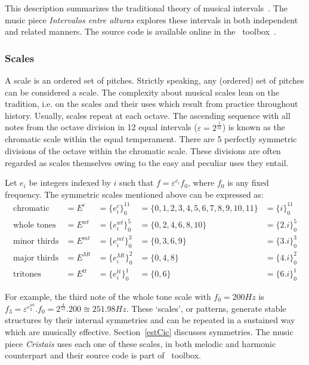 This description summarizes the traditional theory of musical intervals~\cite{Lacerda}. The music piece \emph{Intervalos entre alturas} explores these intervals in both independent and related manners. The source code is available online in the \massa\ toolbox~\cite{MASSA}.

\subsubsection{Scales}\label{subsec:escalas}
A scale is an ordered set of pitches. Strictly speaking, any (ordered) set of pitches can be considered a scale. The complexity about musical scales lean on the tradition, i.e. on the scales and their uses which result from practice throughout history. Usually, scales repeat at each octave. The ascending sequence with all notes from the octave division in 12 equal intervals ($\varepsilon=2^{\frac{1}{12}}$) is known as the chromatic scale within the equal temperament. There are 5 perfectly symmetric divisions of the octave within the chromatic scale. These divisions are often regarded as scales themselves owing to the easy and peculiar uses they entail.

Let $e_i$ be integers indexed by $i$ such that
$f=\varepsilon^{e_i} f_0$,
where $f_0$ is any fixed frequency.
The symmetric scales mentioned above can be expressed as:
\begin{equation}\label{escSim}
\begin{aligned}
	\text{chromatic}    & = E^c    & = \{e_i^c\}_0^{11}   & =  \{0,1,2,3,4,5,6,7,8,9,10,11\} & = \{i\}_0^{11}\\
	\text{whole tones}  & = E^{wt} & = \{e_i^{wt}\}_0^{5} & = \{0,2,4,6,8,10\}               & = \{2.i\}_0^{5} \\
	\text{minor thirds} & = E^{mt} & = \{e_i^{mt}\}_0^{3} & = \{0,3,6,9\}                    & = \{3.i\}_0^3 \\
	\text{major thirds} & = E^{Mt} & = \{e_i^{Mt}\}_0^{2} & = \{0,4,8\}                      & = \{4.i\}_0^2\\
	\text{tritones}     & = E^{tt} & = \{e_i^{tt}\}_0^{1} & = \{ 0, 6 \}                     & = \{6.i\}_0^1
\end{aligned}
\end{equation}

For example, the third note of the whole tone scale with $f_0=200Hz$ is $f_3=\varepsilon^{e_2^{wt}}. f_0 = 2^{\frac{4}{12}} . 200 \approxeq 251.98
Hz$. These `scales', or patterns, generate stable structures by their internal symmetries and can be repeated in a sustained way which are musically effective. Section~\ref{estCic} discusses symmetries.
The music piece \emph{Cristais} uses each one of these scales, in both melodic and harmonic counterpart and their source code is part of \massa\ toolbox.

